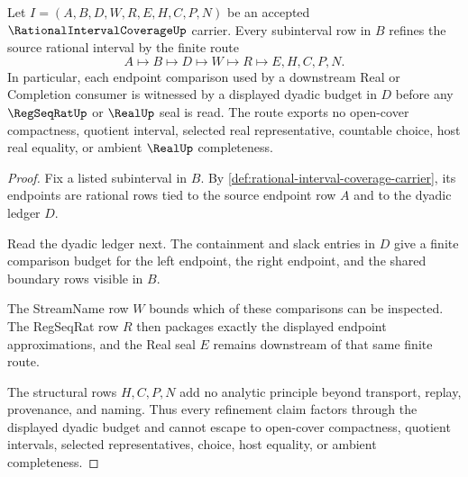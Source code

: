 \begin{theorem}
\label{thm:rational-interval-coverage-dyadic-refinement}
Let $I=(A,B,D,W,R,E,H,C,P,N)$ be an accepted $\RationalIntervalCoverageUp$ carrier. Every subinterval row in $B$ refines the source rational interval by the finite route
$$
A \longmapsto B \longmapsto D \longmapsto W \longmapsto R \longmapsto E,H,C,P,N .
$$
In particular, each endpoint comparison used by a downstream Real or Completion consumer is witnessed by a displayed dyadic budget in $D$ before any $\RegSeqRatUp$ or $\RealUp$ seal is read. The route exports no open-cover compactness, quotient interval, selected real representative, countable choice, host real equality, or ambient $\RealUp$ completeness.
\end{theorem}
\begin{proof}
Fix a listed subinterval in $B$. By \autoref{def:rational-interval-coverage-carrier}, its endpoints are rational rows tied to the source endpoint row $A$ and to the dyadic ledger $D$.

Read the dyadic ledger next. The containment and slack entries in $D$ give a finite comparison budget for the left endpoint, the right endpoint, and the shared boundary rows visible in $B$.

The StreamName row $W$ bounds which of these comparisons can be inspected. The RegSeqRat row $R$ then packages exactly the displayed endpoint approximations, and the Real seal $E$ remains downstream of that same finite route.

The structural rows $H,C,P,N$ add no analytic principle beyond transport, replay, provenance, and naming. Thus every refinement claim factors through the displayed dyadic budget and cannot escape to open-cover compactness, quotient intervals, selected representatives, choice, host equality, or ambient completeness.
\end{proof}

